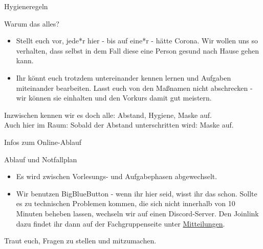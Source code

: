 \begin{frame}[fragile]{Hygieneregeln}
	\begin{alertblock}{Warum das alles?}
		\begin{itemize}
			\item Stellt euch vor, jede*r hier - bis auf eine*r - hätte Corona. Wir wollen uns so verhalten, dass selbst in dem Fall diese eine Person gesund nach Hause gehen kann.
			\item Ihr könnt euch trotzdem untereinander kennen lernen und Aufgaben miteinander bearbeiten. Lasst euch von den Maßnamen nicht abschrecken - wir können sie einhalten und den Vorkurs damit gut meistern.
		\end{itemize}
	\alert{Inzwischen kennen wir es doch alle: Abstand, Hygiene, Maske auf.\\
	Auch hier im Raum: Sobald der Abstand unterschritten wird: Maske auf.}
	\end{alertblock}
\end{frame}

\begin{frame}[fragile]{Infos zum Online-Ablauf}
	\begin{alertblock}{Ablauf und Notfallplan}
		\begin{itemize}
			\item Es wird zwischen Vorlesungs- und Aufgabephasen abgewechselt.
			\item Wir benutzen BigBlueButton - wenn ihr hier seid, wisst ihr das schon. Sollte es zu technischen Problemen kommen, die sich nicht innerhalb von 10 Minuten beheben lassen, wechseln wir auf einen Discord-Server. Den Joinlink dazu findet ihr dann auf der Fachgruppenseite unter \hyperlink{https://fius.informatik.uni-stuttgart.de/index.php/mitteilungen/}{Mitteilungen}.
		\end{itemize}
		\alert{Traut euch, Fragen zu stellen und mitzumachen.}
	\end{alertblock}
\end{frame}
